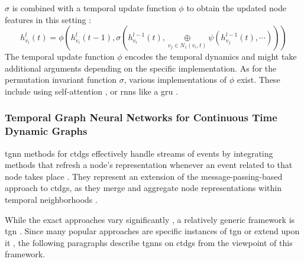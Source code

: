 $\sigma$ is combined with a temporal update function $\phi$ to obtain the updated node features in this setting \cite{you_roland_2022}:
\begin{equation}
    h_{v_i}^l(t) = \phi(h_{v_i}^{l}(t-1), \sigma(h_{v_i}^{l-1}(t), \underset{v_j \in N_1(v_i, t)}{\oplus} \psi(h_{v_j}^{l-1}(t), \cdots)))
\end{equation}
The temporal update function $\phi$ encodes the temporal dynamics \cite{longa_graph_2023} and might take additional arguments depending on the specific implementation. As for the permutation invariant function $\sigma$, various implementations of $\phi$ exist. These include using self-attention \cite{sankar_dysat_2020}, or \glspl{rnn} like a \gls{gru} \cite{you_roland_2022}.

\subsubsection{Temporal Graph Neural Networks for Continuous Time Dynamic Graphs}
\label{s_tgnns_for_ctdgs}
\gls{tgnn} methods for \glspl{ctdg} effectively handle streams of events by integrating methods that refresh a node's representation whenever an event related to that node takes place \cite{longa_graph_2023}. They represent an extension of the message-passing-based approach to \glspl{ctdg}, as they merge and aggregate node representations within temporal neighborhoods \cite{longa_graph_2023}.

While the exact approaches vary significantly \cite{longa_graph_2023}, a relatively generic framework is \gls{tgn} \cite{rossi_temporal_2020}. Since many popular approaches are specific instances of \gls{tgn} \cite{rossi_temporal_2020} or extend upon it \cite{souza_provably_2022}, the following paragraphs describe \glspl{tgnn} on \glspl{ctdg} from the viewpoint of this framework.

